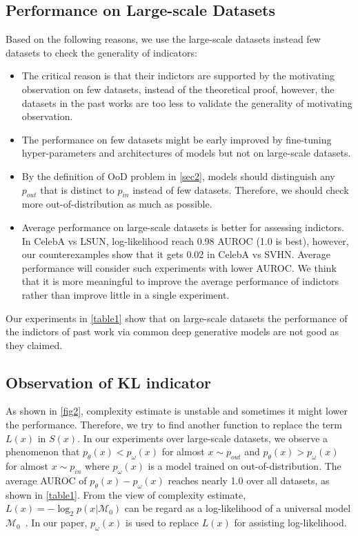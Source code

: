 \documentclass[letterpaper]{article} %
\newcommand{\pin}{p_{in}}
\newcommand{\pout}{p_{out}}
\begin{document}
\subsection{Performance on Large-scale Datasets}
Based on the following reasons, we use the large-scale datasets instead few datasets to check the generality of indicators:

\begin{itemize}
	\item The critical reason is that their indictors are supported by the motivating observation on few datasets, instead of the theoretical proof, however, the datasets in the past works are too less to validate the generality of motivating observation. 
	\item The performance on few datasets might be early improved by fine-tuning hyper-parameters and architectures of models but not on large-scale datasets. 
	\item By the definition of OoD problem in \cref{sec2}, models should distinguish any $\pout$ that is distinct to $\pin$ instead of few datasets. Therefore, we should check more out-of-distribution as much as possible. 
	\item Average performance on large-scale datasets is better for assessing indictors. In CelebA vs LSUN, log-likelihood reach 0.98 AUROC (1.0 is best), however, our counterexamples show that it gets 0.02 in CelebA vs SVHN. Average performance will consider such experiments with lower AUROC. We think that it is more meaningful to improve the average performance of indictors rather than improve little in a single experiment. 
\end{itemize} 


Our experiments in \cref{table1} show that on large-scale datasets the performance of the indictors of past work via common deep generative models are not good as they claimed. 

\subsection{Observation of KL indicator}
As shown in \cref{fig2}, complexity estimate is unstable and sometimes it might lower the performance. Therefore, we try to find another function to replace the term $L(x)$ in $S(x)$. 
In our experiments over large-scale datasets, we observe a phenomenon that $p_\theta(x) < p_\omega(x)$ for almost $x \sim \pout$ and $p_\theta(x) > p_\omega(x)$ for almost $x \sim \pin$ where $p_\omega(x)$ is a model trained on out-of-distribution. The average AUROC of $p_\theta(x) - p_\omega(x)$ reaches nearly 1.0 over all datasets, as shown in \cref{table1}.
From the view of complexity estimate, $L(x) = -\log_2 p(x|\mathcal{M}_0)$ can be regard as a log-likelihood of a universal model $\mathcal{M}_0$~\cite{serra2019input}. In our paper, $p_\omega(x)$ is used to replace $L(x)$ for assisting log-likelihood. 
\end{document}
